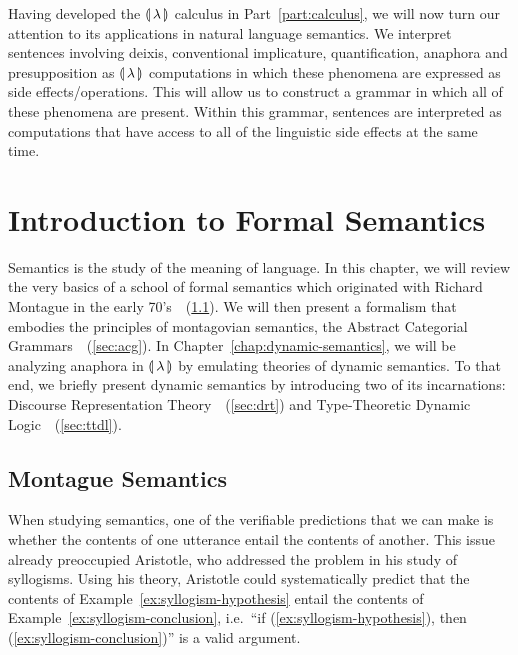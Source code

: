 Having developed the ${\llparenthesis \, \lambda \, \rrparenthesis}$ calculus in Part~\ref{part:calculus}, we will
now turn our attention to its applications in natural language
semantics. We interpret sentences involving deixis, conventional
implicature, quantification, anaphora and presupposition as ${\llparenthesis \, \lambda \, \rrparenthesis}$
computations in which these phenomena are expressed as side
effects/operations. This will allow us to construct a grammar in which all
of these phenomena are present. Within this grammar, sentences are
interpreted as computations that have access to all of the linguistic side
effects at the same time.

\EmptyNewPage


\chapter{Introduction to Formal Semantics}
\label{chap:intro-fs}

Semantics is the study of the meaning of language. In this chapter, we will
review the very basics of a school of formal semantics which originated
with Richard Montague in the early
70's~\cite{montague1970english,montague1970universal,montague1973proper}~(\ref{sec:montague}). We
will then present a formalism that embodies the principles of montagovian
semantics, the Abstract Categorial
Grammars~\cite{de2001towards}~(\ref{sec:acg}). In
Chapter~\ref{chap:dynamic-semantics}, we will be analyzing anaphora in
${\llparenthesis \, \lambda \, \rrparenthesis}$ by emulating theories of dynamic semantics. To that end, we briefly
present dynamic semantics by introducing two of its incarnations: Discourse
Representation Theory~\cite{kamp1993discourse}~(\ref{sec:drt}) and
Type-Theoretic Dynamic
Logic~\cite{de2006towards,lebedeva2012expression}~(\ref{sec:ttdl}).

\minitoc


\section{Montague Semantics}
\label{sec:montague}

When studying semantics, one of the verifiable predictions that we can make
is whether the contents of one utterance entail the contents of
another. This issue already preoccupied Aristotle, who addressed the
problem in his study of syllogisms. Using his theory, Aristotle could
systematically predict that the contents of
Example~\ref{ex:syllogism-hypothesis} entail the contents of
Example~\ref{ex:syllogism-conclusion}, i.e.\ ``if
(\ref{ex:syllogism-hypothesis}), then (\ref{ex:syllogism-conclusion})'' is
a valid argument.

